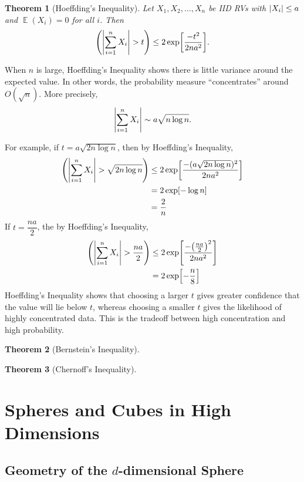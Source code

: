 \documentclass[12pt]{article}
\DeclareMathOperator*{\E}{\mathbb{E}}
\let\Pr\relax
\DeclareMathOperator*{\Pr}{\mathbb{P}}
\newtheorem{theorem}{Theorem}
\begin{document}
\begin{theorem}[Hoeffding's Inequality]
  Let $X_1, X_2, \dots, X_n$ be IID RVs with $\abs{X_i} \leq a$ and $\E(X_i) = 0$ for all $i$.  Then $$\Pr\qty(\abs{\sum_{i=1}^n X_i}>t) \leq 2\exp[\frac{-t^2}{2na^2}].$$
\end{theorem}

When $n$ is large, Hoeffding's Inequality shows there is little variance around the expected value.  In other words, the probability measure ``concentrates'' around $O(\sqrt{n})$.  More precisely,
\begin{align*}
  \abs{\sum_{i=1}^n X_i} \sim a\sqrt{n \log n}.
\end{align*}

For example, if $t = a\sqrt{2 n \log n}$, then by Hoeffding's Inequality,
\begin{align*}
  \Pr\qty(\abs{\sum_{i=1}^n X_i} > \sqrt{2 n \log n}) &\leq 2 \exp[\frac{- (a\sqrt{2 n \log n})^2}{2na^2}] \\
  &= 2 \exp[-\log n] \\
  &= \frac{2}{n}
\end{align*}
If $t = \dfrac{na}{2}$, the by Hoeffding's Inequality,
\begin{align*}
  \Pr\qty(\abs{\sum_{i=1}^n X_i} > \frac{na}{2}) &\leq 2 \exp[\frac{-\qty(\frac{na}{2})^2}{2na^2}] \\
  &= 2\exp[-\frac{n}{8}]
\end{align*}
Hoeffding's Inequality shows that choosing a larger $t$ gives greater confidence that the value will lie below $t$, whereas choosing a smaller $t$ gives the likelihood of highly concentrated data.  This is the tradeoff between high concentration and high probability.

\begin{theorem}[Bernstein's Inequality]
\end{theorem}

\begin{theorem}[Chernoff's Inequality]
\end{theorem}

\section{Spheres and Cubes in High Dimensions}

\subsection{Geometry of the $d$-dimensional Sphere}
\end{document}
